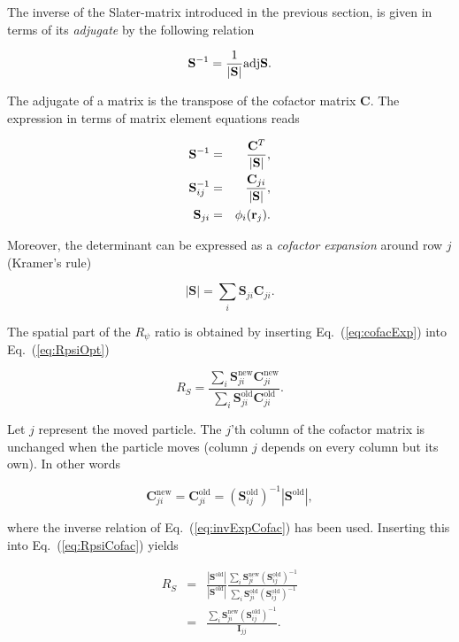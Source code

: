 The inverse of the Slater-matrix introduced in the previous section, is given in terms of its \textit{adjugate} by the following relation \cite{linAlg}

\begin{equation*}
 \mathbf{S}^{-1} = \frac{1}{|\mathbf{S}|}\mathrm{adj} \mathbf{S}.
\end{equation*}

The adjugate of a matrix is the transpose of the cofactor matrix $\mathbf{C}$. The expression in terms of matrix element equations reads

\begin{eqnarray}
 \mathbf{S}^{-1} &=& \frac{\mathbf{C}^T}{|\mathbf{S}|}, \\
 \mathbf{S}^{-1}_{ij} &=& \frac{\mathbf{C}_{ji}}{|\mathbf{S}|}\label{eq:invExpCofac}, \\
 \mathbf{S}_{ji} &=& \phi_i(\mathbf{r}_j). \label{eq:slaterMatPhi}
\end{eqnarray}

Moreover, the determinant can be expressed as a \textit{cofactor expansion} around row $j$ (Kramer's rule) \cite{linAlg}

\begin{equation}
\label{eq:cofacExp}
 |\mathbf{S}| = \sum_i \mathbf{S}_{ji} \mathbf{C}_{ji}.
\end{equation}

The spatial part of the $R_\psi$ ratio is obtained by inserting Eq.~(\ref{eq:cofacExp}) into Eq.~(\ref{eq:RpsiOpt})

\begin{equation}
\label{eq:RpsiCofac}
 R_S = \frac{\sum_i \mathbf{S}_{ji}^\mathrm{new}\mathbf{C}_{ji}^\mathrm{new}}{\sum_i \mathbf{S}_{ji}^\mathrm{old}\mathbf{C}_{ji}^\mathrm{old}}.
\end{equation}

Let $j$ represent the moved particle. The $j$'th column of the cofactor matrix is unchanged when the particle moves (column $j$ depends on every column but its own). In other words

\begin{equation}
 \mathbf{C}_{ji}^\mathrm{new} = \mathbf{C}_{ji}^\mathrm{old} = (\mathbf{S}^\mathrm{old}_{ij})^{-1}|\mathbf{S}^\mathrm{old}|,
\end{equation}

where the inverse relation of Eq.~(\ref{eq:invExpCofac}) has been used. Inserting this into Eq.~(\ref{eq:RpsiCofac}) yields

\begin{eqnarray}
  R_S &=& \frac{|\mathbf{S}^\mathrm{old}|}{|\mathbf{S}^\mathrm{old}|}\frac{\sum_i \mathbf{S}_{ji}^\mathrm{new}(\mathbf{S}_{ij}^\mathrm{old})^{-1}}{\sum_i \mathbf{S}_{ji}^\mathrm{old}(\mathbf{S}_{ij}^\mathrm{old})^{-1}} \nonumber\\
         &=& \frac{\sum_i \mathbf{S}_{ji}^\mathrm{new}(\mathbf{S}_{ij}^\mathrm{old})^{-1}}{\mathbf{I}_{jj}}. \nonumber
\end{eqnarray}

